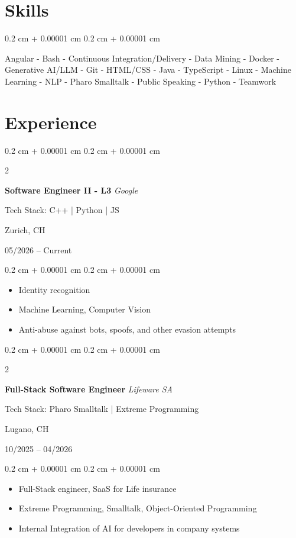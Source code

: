 \documentclass[10pt, letterpaper]{article}
\newenvironment{highlights}{
    \begin{itemize}[
        topsep=0.10 cm,
        parsep=0.10 cm,
        partopsep=0pt,
        itemsep=0pt,
        leftmargin=0.4 cm + 10pt
    ]
}{
    \end{itemize}
} %
\newenvironment{onecolentry}{
    \begin{adjustwidth}{
        0.2 cm + 0.00001 cm
    }{
        0.2 cm + 0.00001 cm
    }
}{
    \end{adjustwidth}
} %
\newenvironment{twocolentry}[2][]{
    \onecolentry
    \def\secondColumn{#2}
    \setcolumnwidth{\fill, 4.5 cm}
    \begin{paracol}{2}
}{
    \switchcolumn \raggedleft \secondColumn
    \end{paracol}
    \endonecolentry
} %
\begin{document}
    
    \section{Skills}

        \begin{onecolentry}
            Angular - Bash - Continuous Integration/Delivery - Data Mining - Docker - Generative AI/LLM - Git - HTML/CSS - Java - TypeScript - Linux - Machine Learning - NLP - Pharo Smalltalk - Public Speaking - Python - Teamwork  
        \end{onecolentry}

     
    \section{Experience}
        \begin{twocolentry}{
        Zurich, CH
        
        05/2026 – Current}
            \textbf{Software Engineer II - L3} \textit{Google}

            {\footnotesize Tech Stack: C++ | Python | JS}
        \end{twocolentry}

        \vspace{0.10 cm}
                \begin{onecolentry}
            \begin{highlights}
                \item Identity recognition
                \item Machine Learning, Computer Vision
                \item Anti-abuse against bots, spoofs, and other evasion attempts
            \end{highlights}
        \end{onecolentry}
        \vspace{0.2 cm}

        \begin{twocolentry}{
        Lugano, CH
        
        10/2025 – 04/2026}
            \textbf{Full-Stack Software Engineer} \textit{Lifeware SA}

            {\footnotesize Tech Stack: Pharo Smalltalk | Extreme Programming}
        \end{twocolentry}

        \vspace{0.10 cm}
                \begin{onecolentry}
            \begin{highlights}
                \item Full-Stack engineer, SaaS for Life insurance
                \item Extreme Programming, Smalltalk, Object-Oriented Programming
                \item Internal Integration of AI for developers in company systems 
            \end{highlights}
        \end{onecolentry}
        \vspace{0.2 cm}
\end{document}
